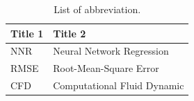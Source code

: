 \documentclass[mathematics,article,submit,pdftex,moreauthors]{Definitions/mdpi}
\begin{document}
\begin{table}[H] 
\caption{List of abbreviation.\label{A:tab2}}
\begin{tabularx}{\textwidth}{ll}
\toprule
\textbf{Title 1}	& \textbf{Title 2}	\\
\midrule
NNR		& Neural Network Regression	\\
RMSE		& Root-Mean-Square Error	\\
CFD & Computational Fluid Dynamic \\
\bottomrule
\end{tabularx}
\end{table}

\end{document}
